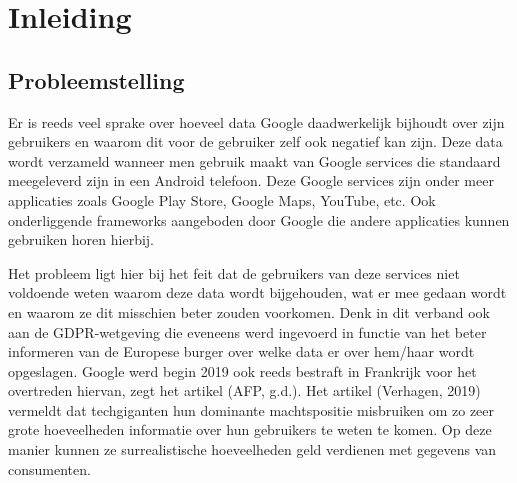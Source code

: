 
\chapter{Inleiding}
\label{ch:inleiding}




\section{Probleemstelling}
\label{sec:probleemstelling}

Er is reeds veel sprake over hoeveel data Google daadwerkelijk bijhoudt over zijn gebruikers en waarom dit voor de gebruiker zelf ook negatief kan zijn. Deze data wordt verzameld wanneer men gebruik maakt van Google services die standaard meegeleverd zijn in een Android telefoon. Deze Google services zijn onder meer applicaties zoals Google Play Store, Google Maps, YouTube, etc. Ook onderliggende frameworks aangeboden door Google die andere applicaties kunnen gebruiken horen hierbij. 

Het probleem ligt hier bij het feit dat de gebruikers van deze services niet voldoende weten waarom deze data wordt bijgehouden, wat er mee gedaan wordt en waarom ze dit misschien beter zouden voorkomen. Denk in dit verband ook aan de GDPR-wetgeving %
die eveneens werd ingevoerd in functie van het beter informeren van de Europese burger over welke data er over hem/haar wordt opgeslagen. Google werd begin 2019 ook reeds bestraft in Frankrijk voor het overtreden hiervan, zegt het artikel (AFP, g.d.). Het artikel (Verhagen, 2019) vermeldt dat techgiganten hun dominante machtspositie misbruiken om zo zeer grote hoeveelheden informatie over hun gebruikers te weten te komen. Op deze manier kunnen ze surrealistische hoeveelheden geld verdienen met gegevens van consumenten. %


